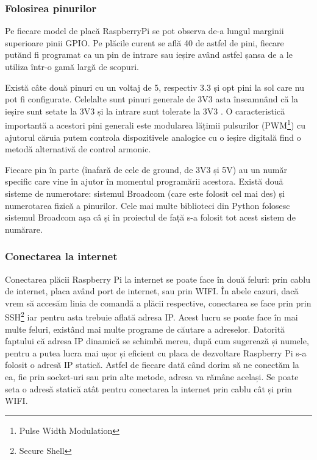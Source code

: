 \documentclass[../IoMusT.tex]{subfiles}
\begin{document}
\subsubsection{Folosirea pinurilor}
Pe fiecare model de placă RaspberryPi se pot observa de-a lungul marginii  superioare pinii GPIO. Pe plăcile curent se află 40 de astfel de pini, fiecare putănd fi programat ca un pin de intrare sau ieșire având astfel șansa de a le utiliza într-o gamă largă de scopuri.
\\
\par Există câte două pinuri cu un voltaj de 5, respectiv 3.3 și opt pini la sol care nu pot fi configurate. Celelalte sunt pinuri generale de 3V3 asta înseamnând că la ieșire sunt setate la 3V3 și la intrare sunt tolerate la 3V3 \cite{RaspPi}. O caracteristică importantă a acestori pini generali este modularea lățimii pulsurilor (PWM\footnote{Pulse Width Modulation}) cu ajutorul căruia putem controla dispozitivele analogice cu o ieșire digitală \cite{PWM} find o metodă alternativă de control armonic. 
\\
\par Fiecare pin în parte (înafară de cele de ground, de 3V3 și 5V) au un număr specific care vine în ajutor în momentul programării acestora. Există două sisteme de numerotare: sistemul Broadcom (care este folosit cel mai des) și numerotarea fizică a pinurilor. Cele mai multe biblioteci din Python folosesc sistemul Broadcom așa câ și în proiectul de față s-a folosit tot acest sistem de numărare.

\subsubsection{Conectarea la internet}
Conectarea plăcii Raspberry Pi la internet se poate face în două feluri: prin cablu de internet, placa având port de internet, sau prin WIFI. În abele cazuri, dacă vrem să accesăm linia de comandă a plăcii respective, conectarea se face prin prin SSH\footnote{Secure Shell} iar pentru asta trebuie aflată adresa IP. Acest lucru se poate face în mai multe feluri, existând mai multe programe de căutare a adreselor. Datorită faptului că adresa IP dinamică se schimbă mereu, după cum sugerează și numele, pentru a putea lucra mai ușor și eficient cu placa de dezvoltare Raspberry Pi s-a folosit o adresă IP statică. Astfel de fiecare dată când dorim să ne conectăm la ea, fie prin socket-uri sau prin alte metode, adresa va rămâne același. Se poate seta o adresă statică atât pentru conectarea la internet prin cablu cât și prin WIFI.
\end{document}
